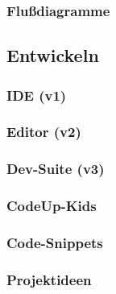 \documentclass[main.tex]{subfiles}
\begin{document}
    \subsubsection{Flußdiagramme}
    \subsection{Entwickeln}
    \subsubsection{IDE (v1)}
    \subsubsection{Editor (v2)}
    \subsubsection{Dev-Suite (v3)}
    \subsubsection{CodeUp-Kids}
    \subsubsection{Code-Snippets}
    \subsubsection{Projektideen}
\end{document}
